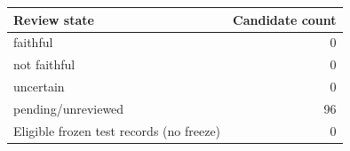 \begin{tabular}{lr}
\toprule
Review state & Candidate count\\
\midrule
faithful & 0 \\
not faithful & 0 \\
uncertain & 0 \\
pending/unreviewed & 96 \\
\midrule
Eligible frozen test records (no freeze) & 0 \\
\bottomrule
\end{tabular}
